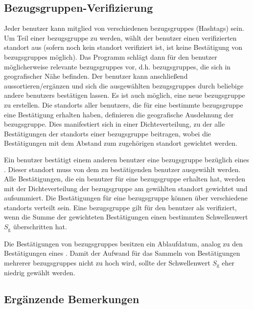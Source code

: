 \documentclass[10pt]{article}
\begin{document}
\subsection{Bezugsgruppen-Verifizierung}

Jeder \gls{benutzer} kann \gls{mitglied} von verschiedenen \glspl{bezugsgruppe} (Hashtags) sein. Um Teil einer \gls{bezugsgruppe} zu werden, wählt der \gls{benutzer} einen verifizierten \gls{standort} aus (sofern noch kein \gls{standort} verifiziert ist, ist keine Bestätigung von \glspl{bezugsgruppe} möglich). Das Programm schlägt dann für den \gls{benutzer} möglicherweise relevante \glspl{bezugsgruppe} vor, d.h. \glspl{bezugsgruppe}, die sich in geografischer Nähe befinden. Der \gls{benutzer} kann anschließend aussortieren/ergänzen und sich die ausgewählten \glspl{bezugsgruppe} durch beliebige andere \glspl{benutzer} bestätigen lassen. Es ist auch möglich, eine neue \gls{bezugsgruppe} zu erstellen. Die \glspl{standort} aller \glspl{benutzer}, die für eine bestimmte \gls{bezugsgruppe} eine Bestätigung erhalten haben, definieren die geografische Ausdehnung der \gls{bezugsgruppe}. Dies manifestiert sich in einer Dichteverteilung, zu der alle Bestätigungen der \glspl{standort} einer \gls{bezugsgruppe} beitragen, wobei die Bestätigungen mit dem Abstand zum zugehörigen \gls{standort} gewichtet werden.

Ein \gls{benutzer} bestätigt einem anderen \gls{benutzer} eine \gls{bezugsgruppe} bezüglich eines . Dieser \gls{standort} muss von dem zu bestätigenden \gls{benutzer} ausgewählt werden. Alle Bestätigungen, die ein \gls{benutzer} für eine \gls{bezugsgruppe} erhalten hat, werden mit der Dichteverteilung der \gls{bezugsgruppe} am gewählten \gls{standort} gewichtet und aufsummiert. Die Bestätigungen für eine \gls{bezugsgruppe} können über verschiedene \glspl{standort} verteilt sein. Eine \gls{bezugsgruppe} gilt für den \gls{benutzer} als verifiziert, wenn die Summe der gewichteten Bestätigungen einen bestimmten Schwellenwert $S_\text{g}$ überschritten hat.

Die Bestätigungen von \glspl{bezugsgruppe} besitzen ein Ablaufdatum, analog zu den Bestätigungen eines . Damit der Aufwand für das Sammeln von Bestätigungen mehrerer \glspl{bezugsgruppe} nicht zu hoch wird, sollte der Schwellenwert $S_\text{g}$ eher niedrig gewählt werden.

\subsection{Ergänzende Bemerkungen}
\end{document}
